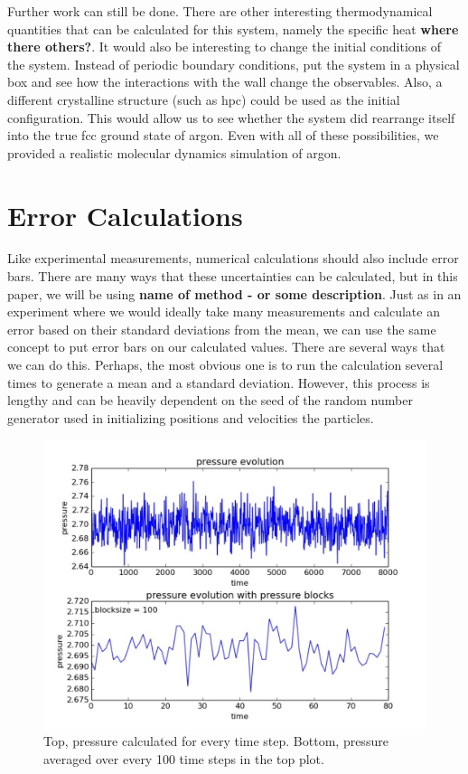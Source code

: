 \documentclass{article}
\begin{document}
\begin{multicols}{2}
Further work can still be done.  There are other interesting thermodynamical quantities that can be calculated for this system, namely the specific heat \textbf{where there others?}.  It would also be interesting to change the initial conditions of the system.  Instead of periodic boundary conditions, put the system in a physical box and see how the interactions with the wall change the observables.  Also, a different crystalline structure (such as hpc) could be used as the initial configuration.  This would allow us to see whether the system did rearrange itself into the true fcc ground state of argon.  Even with all of these possibilities, we provided a realistic molecular dynamics simulation of argon.  

\appendix 

\section{Error Calculations}

Like experimental measurements, numerical calculations should also include error bars.  There are many ways that these uncertainties can be calculated, but in this paper, we will be using \textbf{name of method - or some description}.  Just as in an experiment where we would ideally take many measurements and calculate an error based on their standard deviations from the mean, we can use the same concept to put error bars on our calculated values.  There are several ways that we can do this.  Perhaps, the most obvious one is to run the calculation several times to generate a mean and a standard deviation.  However, this process is lengthy and can be heavily dependent on the seed of the random number generator used in initializing positions and velocities the particles.  \\

\begin{figure}[H]
\begin{center}
\includegraphics[width=\linewidth]{plots/presn100lp10000T1rho088prt864.pdf}
\caption{Top, pressure calculated for every time step.  Bottom, pressure averaged over every 100 time steps in the top plot.  }
\label{errex}
\end{center}
\end{figure}


\end{multicols}
\end{document}
